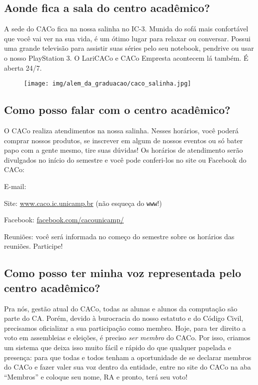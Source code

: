 \subsection{Aonde fica a sala do centro acadêmico?}

A sede do CACo fica na nossa salinha no IC-3. Munida do sofá mais confortável
que você vai ver na sua vida, é um ótimo lugar para relaxar ou conversar.
Possui uma grande televisão para assistir suas séries pelo seu notebook,
pendrive ou usar o nosso PlayStation 3. O LariCACo e CACo Empresta acontecem lá
também. É aberta 24/7.

\begin{figure}[H]
  \centering
  \texttt{[image: img/alem\_da\_graduacao/caco\_salinha.jpg]}
\end{figure}

\subsection{Como posso falar com o centro acadêmico?}

O CACo realiza atendimentos na nossa salinha. Nesses horários, você poderá
comprar nossos produtos, se inscrever em algum de nossos eventos ou só bater
papo com a gente mesmo, tire suas dúvidas! Os horários de atendimento serão
divulgados no início do semestre e você pode conferi-los no site ou Facebook do
CACo:

\begin{compactitemize}
\item E-mail: 
\item Site: \url{www.caco.ic.unicamp.br} (não esqueça do \texttt{www}!)
\item Facebook: \url{facebook.com/cacounicamp/}
\item Reuniões: você será informada no começo do semestre sobre os horários das
  reuniões. Participe!
\end{compactitemize}

\subsection{Como posso ter minha voz representada pelo centro acadêmico?}

Pra nós, gestão atual do CACo, todas as alunas e alunos da computação são parte
do CA. Porém, devido à burocracia do nosso estatuto e do Código Civil,
precisamos oficializar a sua participação como membro. Hoje, para ter direito a
voto em assembleias e eleições, é preciso \emph{ser membro} do CACo. Por isso,
criamos um sistema que deixa isso muito fácil e rápido do que qualquer papelada
e presença: para que todas e todos tenham a oportunidade de se declarar membros
do CACo e fazer valer sua voz dentro da entidade, entre no site do CACo na aba
``Membros'' e coloque seu nome, RA e pronto, terá seu voto!

